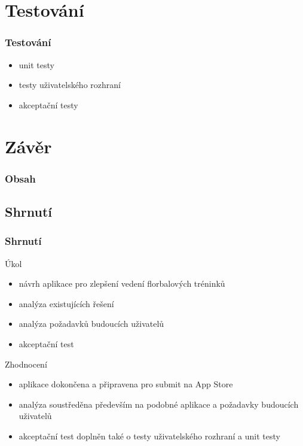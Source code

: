\documentclass{beamer}
\begin{document}
\section{Testování}

\begin{frame}
  \frametitle{Testování}
  \begin{itemize}
    \item unit testy
    \item testy uživatelského rozhraní
    \item akceptační testy
  \end{itemize}
\end{frame}

\section{Závěr}

\begin{frame}
  \frametitle{Obsah}
  \tableofcontents[currentsection]
\end{frame}

\subsection{Shrnutí}

\begin{frame}
  \frametitle{Shrnutí}

  \begin{block}{Úkol}
    \begin{itemize}
      \item návrh aplikace pro zlepšení vedení florbalových tréninků
      \item analýza existujících řešení
      \item analýza požadavků budoucích uživatelů
      \item akceptační test
    \end{itemize}

  \end{block}

  \begin{block}{Zhodnocení}
    \begin{itemize}
      \item aplikace dokončena a připravena pro submit na App Store
      \item analýza soustředěna především na podobné aplikace a požadavky budoucích uživatelů
      \item akceptační test doplněn také o testy uživatelského rozhraní a unit testy
    \end{itemize}
  \end{block}
\end{frame}
\end{document}
